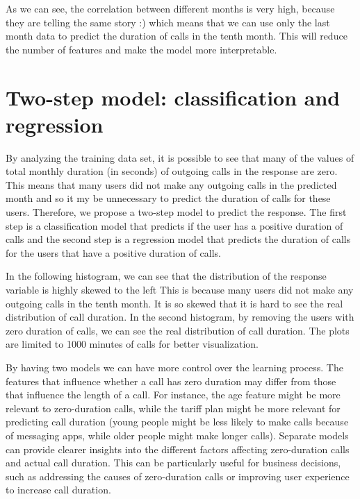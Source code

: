 \documentclass[
]{article}
\begin{document}
As we can see, the correlation between different months is very high,
because they are telling the same story :) which means that we can use
only the last month data to predict the duration of calls in the tenth
month. This will reduce the number of features and make the model more
interpretable.

\hypertarget{two-step-model-classification-and-regression}{%
\section{Two-step model: classification and
regression}\label{two-step-model-classification-and-regression}}

By analyzing the training data set, it is possible to see that many of
the values of total monthly duration (in seconds) of outgoing calls in
the response are zero. This means that many users did not make any
outgoing calls in the predicted month and so it my be unnecessary to
predict the duration of calls for these users. Therefore, we propose a
two-step model to predict the response. The first step is a
classification model that predicts if the user has a positive duration
of calls and the second step is a regression model that predicts the
duration of calls for the users that have a positive duration of calls.

In the following histogram, we can see that the distribution of the
response variable is highly skewed to the left This is because many
users did not make any outgoing calls in the tenth month. It is so
skewed that it is hard to see the real distribution of call duration. In
the second histogram, by removing the users with zero duration of calls,
we can see the real distribution of call duration. The plots are limited
to 1000 minutes of calls for better visualization.

By having two models we can have more control over the learning process.
The features that influence whether a call has zero duration may differ
from those that influence the length of a call. For instance, the age
feature might be more relevant to zero-duration calls, while the tariff
plan might be more relevant for predicting call duration (young people
might be less likely to make calls because of messaging apps, while
older people might make longer calls). Separate models can provide
clearer insights into the different factors affecting zero-duration
calls and actual call duration. This can be particularly useful for
business decisions, such as addressing the causes of zero-duration calls
or improving user experience to increase call duration.
\end{document}
